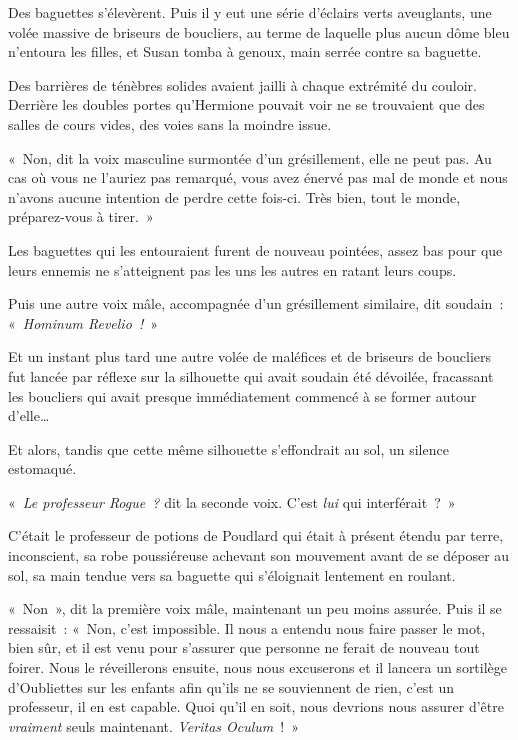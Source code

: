 Des baguettes s'élevèrent. Puis il y eut une série d'éclairs verts aveuglants, une volée massive de briseurs de boucliers, au terme de laquelle plus aucun dôme bleu n'entoura les filles, et Susan tomba à genoux, main serrée contre sa baguette.

Des barrières de ténèbres solides avaient jailli à chaque extrémité du couloir. Derrière les doubles portes qu'Hermione pouvait voir ne se trouvaient que des salles de cours vides, des voies sans la moindre issue.

«~Non, dit la voix masculine surmontée d'un grésillement, elle ne peut pas. Au cas où vous ne l'auriez pas remarqué, vous avez énervé pas mal de monde et nous n'avons aucune intention de perdre cette fois-ci. Très bien, tout le monde, préparez-vous à tirer.~»

Les baguettes qui les entouraient furent de nouveau pointées, assez bas pour que leurs ennemis ne s'atteignent pas les uns les autres en ratant leurs coups.

Puis une autre voix mâle, accompagnée d'un grésillement similaire, dit soudain~: «~\emph{Hominum Revelio~!}~»

Et un instant plus tard une autre volée de maléfices et de briseurs de boucliers fut lancée par réflexe sur la silhouette qui avait soudain été dévoilée, fracassant les boucliers qui avait presque immédiatement commencé à se former autour d'elle…

Et alors, tandis que cette même silhouette s'effondrait au sol, un silence estomaqué.

«~\emph{Le professeur Rogue~?} dit la seconde voix. C'est \emph{lui} qui interférait~?~»

C'était le professeur de potions de Poudlard qui était à présent étendu par terre, inconscient, sa robe poussiéreuse achevant son mouvement avant de se déposer au sol, sa main tendue vers sa baguette qui s'éloignait lentement en roulant.

«~Non~», dit la première voix mâle, maintenant un peu moins assurée. Puis il se ressaisit~: «~Non, c'est impossible. Il nous a entendu nous faire passer le mot, bien sûr, et il est venu pour s'assurer que personne ne ferait de nouveau tout foirer. Nous le réveillerons ensuite, nous nous excuserons et il lancera un sortilège d'Oubliettes sur les enfants afin qu'ils ne se souviennent de rien, c'est un professeur, il en est capable. Quoi qu'il en soit, nous devrions nous assurer d'être \emph{vraiment} seuls maintenant. \emph{Veritas Oculum}~!~»

